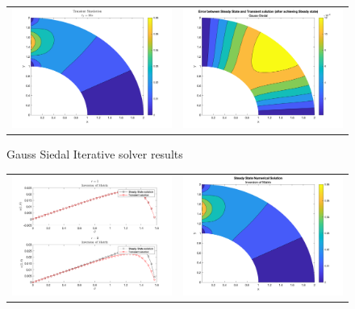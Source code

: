 \documentclass[11pt]{article}
\begin{document}
\begin{enumerate}
\begin{enumerate}
\begin{figure}[htp]
\begin{tabular}{cc}
            \includegraphics[width=3.5in]{p32} & \includegraphics[width=3.5in]{p42}
        \end{tabular}
        \caption{Gauss Siedal Iterative solver results}
        \label{fig:P_GS}
    \end{figure}
    \begin{figure}[htp]
        \centering
        \begin{tabular}{cc}
            \includegraphics[width=3.5in]{p13} & \includegraphics[width=3.5in]{p23} \\ 

\end{tabular}
\end{figure}
\end{enumerate}
\end{enumerate}
\end{document}
